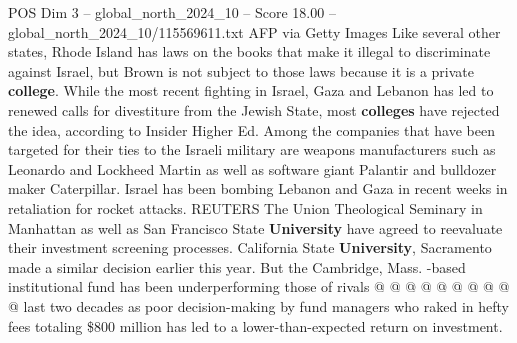 \begin{textsample}{POS Dim 3 – global\_north\_2024\_10 – Score 18.00 – global\_north\_2024\_10/115569611.txt}
AFP via Getty Images Like several other states, Rhode Island has laws on the books that make it illegal to discriminate against Israel, but Brown is not subject to those laws because it is a private \textbf{college}.
While the most recent fighting in Israel, Gaza and Lebanon has led to renewed calls for divestiture from the Jewish State, most \textbf{colleges} have rejected the idea, according to Insider Higher Ed.
Among the companies that have been targeted for their ties to the Israeli military are weapons manufacturers such as Leonardo and Lockheed Martin as well as software giant Palantir and bulldozer maker Caterpillar.
Israel has been bombing Lebanon and Gaza in recent weeks in retaliation for rocket attacks.
REUTERS The Union Theological Seminary in Manhattan as well as San Francisco State \textbf{University} have agreed to reevaluate their investment screening processes.
California State \textbf{University}, Sacramento made a similar decision earlier this year.
But the Cambridge, Mass. -based institutional fund has been underperforming those of rivals @ @ @ @ @ @ @ @ @ @ last two decades as poor decision-making by fund managers who raked in hefty fees totaling \$800 million has led to a lower-than-expected return on investment.

\end{textsample}
